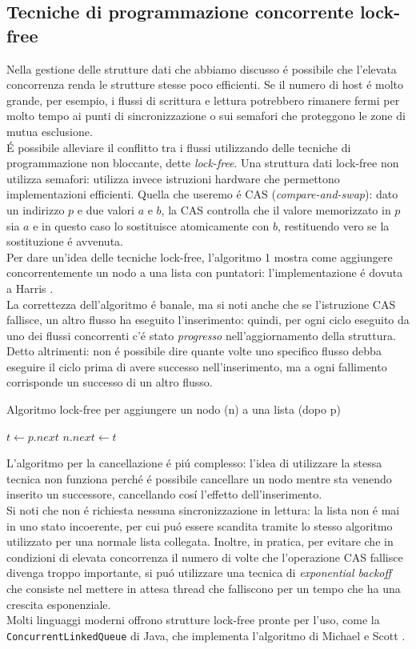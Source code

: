 \subsection{Tecniche di programmazione concorrente lock-free}
Nella gestione delle strutture dati che abbiamo discusso é possibile che l'elevata concorrenza renda le strutture stesse poco efficienti. Se il numero di host é molto grande, per esempio, i flussi di scrittura e lettura potrebbero rimanere fermi per molto tempo ai punti di sincronizzazione o sui semafori che proteggono le zone di mutua esclusione.\\
É possibile alleviare il conflitto tra i flussi utilizzando delle tecniche di programmazione non bloccante, dette \textit{lock-free}. Una struttura dati lock-free non utilizza semafori: utilizza invece istruzioni hardware che permettono implementazioni efficienti. Quella che useremo é CAS (\textit{compare-and-swap}): dato un indirizzo $p$ e due valori $a$ e $b$, la CAS controlla che il valore memorizzato in $p$ sia $a$ e in questo caso lo sostituisce atomicamente con $b$, restituendo vero se la sostituzione é avvenuta.\\
Per dare un'idea delle tecniche lock-free, l'algoritmo 1 mostra come aggiungere concorrentemente un nodo a una lista con puntatori: l'implementazione é dovuta a Harris \cite{harris}.\\
La correttezza dell'algoritmo é banale, ma si noti anche che se l'istruzione CAS fallisce, un altro flusso ha eseguito l'inserimento: quindi, per ogni ciclo eseguito da uno dei flussi concorrenti c'é stato \textit{progresso} nell'aggiornamento della struttura. Detto altrimenti: non é possibile dire quante volte uno specifico flusso debba eseguire il ciclo prima di avere successo nell'inserimento, ma a ogni fallimento corrisponde un successo di un altro flusso.
\begin{algorithm}
\caption{Algoritmo lock-free per aggiungere un nodo (n) a una lista (dopo p)}
\begin{algorithmic}
\Do
\State $t \gets p.next$
\State $n.next \gets t$
\end{algorithmic}
\end{algorithm}
L'algoritmo per la cancellazione é piú complesso: l'idea di utilizzare la stessa tecnica non funziona perché é possibile cancellare un nodo mentre sta venendo inserito un successore, cancellando cosí l'effetto dell'inserimento.\\
Si noti che non é richiesta nessuna sincronizzazione in lettura: la lista non é mai in uno stato incoerente, per cui puó essere scandita tramite lo stesso algoritmo utilizzato per una normale lista collegata. Inoltre, in pratica, per evitare che in condizioni di elevata concorrenza il numero di volte che l'operazione CAS fallisce divenga troppo importante, si puó utilizzare una tecnica di \textit{exponential backoff} che consiste nel mettere in attesa thread che falliscono per un tempo che ha una crescita esponenziale.\\
Molti linguaggi moderni offrono strutture lock-free pronte per l'uso, come la \texttt{ConcurrentLinkedQueue} di Java, che implementa l'algoritmo di Michael e Scott \cite{prisonmike}.